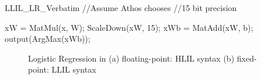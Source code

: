 \begin{SaveVerbatim}[]{LLIL_LR_Verbatim}
//Assume Athos chooses
//15 bit precision

xW = MatMul(x, W);
ScaleDown(xW, 15);
xWb = MatAdd(xW, b);
output(ArgMax(xWb));
\end{SaveVerbatim}

\begin{figure}
  \centering
  \caption{Logistic Regression in (a) floating-point: HLIL syntax (b) fixed-point: LLIL syntax}
\end{figure}
